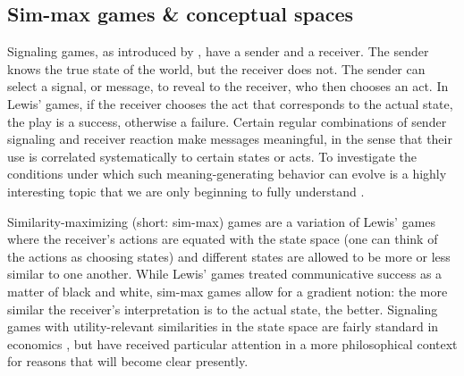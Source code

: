 \documentclass[fleqn,reqno,10pt]{article}
\begin{document}
\subsection{Sim-max games \& conceptual spaces}

Signaling games, as introduced by \citet{Lewis_1969:Convention}, have
a sender and a receiver. The sender knows the true state of the world,
but the receiver does not. The sender can select a signal, or message,
to reveal to the receiver, who then chooses an act. In Lewis' games,
if the receiver chooses the act that corresponds to the actual state,
the play is a success, otherwise a failure. Certain regular
combinations of sender signaling and receiver reaction make messages
meaningful, in the sense that their use is correlated systematically
to certain states or acts. To investigate the conditions under which
such meaning-generating behavior can evolve is a highly interesting
topic that we are only beginning to fully understand
\citep[e.g.][]{Warneryd1993:Cheap-Talk-Coor,BlumeKim1993:Evolutionary-St,Huttegger2007:Evolution-and-t,Pawlowitsch2008:Why-Evolution-d,Barrett2009:The-Evolution-o,HutteggerSkyrms2010:Evolutionary-Dy,Skyrms2010:Signals}.

Similarity-maximizing (short: sim-max) games are a variation of
Lewis' games where the receiver's actions are equated with the state
space (one can think of the actions as choosing states) and different states are allowed to be more or less
similar to one another. While Lewis' games treated communicative
success as a matter of black and white, sim-max games allow for a
gradient notion: the more similar the receiver's interpretation is to
the actual state, the better. Signaling games with utility-relevant
similarities in the state space are fairly standard in economics
\citep[e.g.][]{Spence1973:Job-market-sign,CrawfordSobel1982:Strategic-Infor},
but have received particular attention in a more philosophical context
for reasons that will become clear presently.
\end{document}
